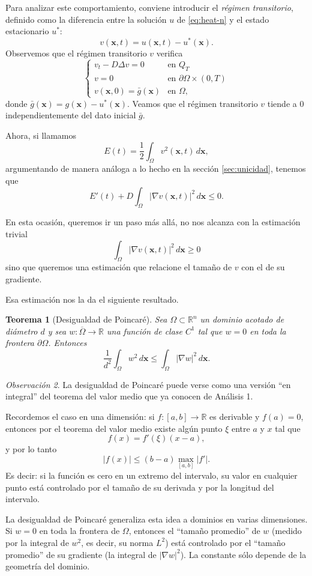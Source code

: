 \documentclass[12pt, a4paper]{amsbook}
\newcommand{\R}{{\mathbb R}}
\newcommand{\xx}{{\mathbf x}}
\newtheorem{teo}{Teorema}[section]
\theoremstyle{remark}
\newtheorem{obs}[teo]{Observación}
\theoremstyle{definition}
\numberwithin{section}{chapter}
\numberwithin{subsection}{section}
\numberwithin{equation}{section}
\numberwithin{figure}{chapter}
\begin{document}
Para analizar este comportamiento, conviene introducir el \emph{régimen transitorio}, definido como la diferencia entre la solución $u$ de \eqref{eq:heat-n} y el estado estacionario $u^*$:
$$
v(\xx, t) = u(\xx, t)-u^*(\xx).
$$
Observemos que el régimen transitorio $v$ verifica
$$
\begin{cases}
v_t - D\Delta v = 0 & \text{en } Q_T\\
v = 0 & \text{en } \partial\Omega\times (0,T)\\
v(\xx, 0 ) = \bar g(\xx) & \text{en }\Omega,
\end{cases}
$$
donde $\bar g(\xx) = g(\xx)-u^*(\xx)$. Veamos que el régimen transitorio $v$ tiende a 0 independientemente del dato inicial $\bar g$.

Ahora, si llamamos
$$
E(t) = \frac12\int_\Omega v^2(\xx, t)\, d\xx,
$$
argumentando de manera análoga a lo hecho en la sección \ref{sec:unicidad}, tenemos que
\begin{equation}\label{energia1}
E'(t) + D\int_\Omega |\nabla v(\xx, t)|^2\, d\xx \le 0.
\end{equation}

En esta ocasión, queremos ir un paso más allá, no nos alcanza con la estimación trivial
$$
\int_\Omega |\nabla v(\xx, t)|^2\, d\xx\ge 0
$$
sino que queremos una estimación que relacione el tamaño de $v$ con el de su gradiente.

Esa estimación nos la da el siguiente resultado.
\begin{teo}[Desigualdad de Poincaré]\label{teo:Poincare}
Sea $\Omega\subset\R^n$ un dominio acotado de diámetro $d$ y sea $w\colon \overline{\Omega}\to\R$ una función de clase $C^1$ tal que $w=0$ en toda la frontera $\partial\Omega$. Entonces
$$
\frac{1}{d^2} \int_\Omega w^2\, d\xx \le \int_\Omega |\nabla w|^2\, d\xx.
$$
\end{teo}

\begin{obs}
La desigualdad de Poincaré puede verse como una versión ``en integral'' del teorema del valor medio que ya conocen de Análisis 1.

Recordemos el caso en una dimensión: si $f\colon [a,b]\to\R$ es derivable y $f(a)=0$, entonces por el teorema del valor medio existe algún punto $\xi$ entre $a$ y $x$ tal que
\[
f(x) = f'(\xi)(x-a),
\]
y por lo tanto
\[
|f(x)| \le (b-a) \max_{[a,b]} |f'|.
\]
Es decir: si la función es cero en un extremo del intervalo, su valor en cualquier punto está controlado por el tamaño de su derivada y por la longitud del intervalo.

La desigualdad de Poincaré generaliza esta idea a dominios en varias dimensiones. Si $w=0$ en toda la frontera de $\Omega$, entonces el ``tamaño promedio'' de $w$ (medido por la integral de $w^2$, es decir, su norma $L^2$) está controlado por el ``tamaño promedio'' de su gradiente (la integral de $|\nabla w|^2$). La constante sólo depende de la geometría del dominio.
\end{obs}
\end{document}
